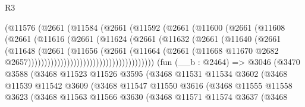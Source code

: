 \begin{lexlean}{R3}
\begin{coremodule}
                                (@11576
                                  (@2661
                                    (@11584
                                      (@2661
                                        (@11592
                                          (@2661
                                            (@11600
                                              (@2661
                                                (@11608
                                                  (@2661
                                                    (@11616
                                                      (@2661
                                                        (@11624
                                                          (@2661
                                                            (@11632
                                                              (@2661
                                                                (@11640
                                                                  (@2661
                                                                    (@11648
                                                                      (@2661
                                                                        (@11656
                                                                          (@2661
                                                                            (@11664
                                                                              (@2661
                                                                                (@11668
                                                                                  @11670
                                                                                  @2682
                                                                                  @2657)))))))))))))))))))))))))))))))))))))))
    (fun (__b : @2464) =>
    @3046
      (@3470
        @3588
        (@3468
          @11523
          @11526
          @3595
          (@3468
            @11531
            @11534
            @3602
            (@3468
              @11539
              @11542
              @3609
              (@3468
                @11547
                @11550
                @3616
                (@3468
                  @11555
                  @11558
                  @3623
                  (@3468
                    @11563
                    @11566
                    @3630
                    (@3468
                      @11571
                      @11574
                      @3637
                      (@3468

\end{coremodule}
\end{lexlean}
